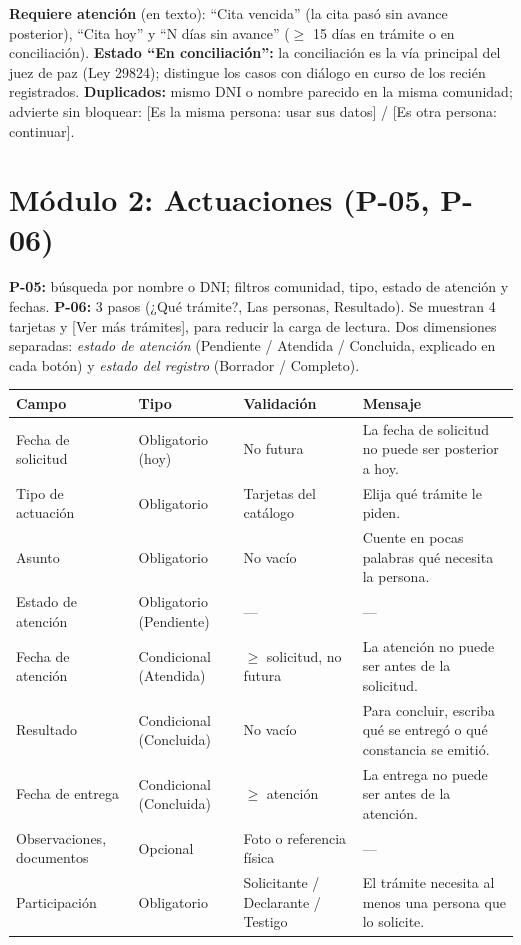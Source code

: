 \documentclass[11pt,a4paper]{article}
\begin{document}
\textbf{Requiere atención} (en texto): ``Cita vencida'' (la cita pasó sin avance posterior), ``Cita hoy'' y ``N días sin avance'' ($\geq$ 15 días en trámite o en conciliación). \textbf{Estado ``En conciliación'':} la conciliación es la vía principal del juez de paz (Ley 29824); distingue los casos con diálogo en curso de los recién registrados. \textbf{Duplicados:} mismo DNI o nombre parecido en la misma comunidad; advierte sin bloquear: [Es la misma persona: usar sus datos] / [Es otra persona: continuar].

\section{Módulo 2: Actuaciones (P-05, P-06)}
\textbf{P-05:} búsqueda por nombre o DNI; filtros comunidad, tipo, estado de atención y fechas. \textbf{P-06:} 3 pasos (¿Qué trámite?, Las personas, Resultado). Se muestran 4 tarjetas y [Ver más trámites], para reducir la carga de lectura. Dos dimensiones separadas: \emph{estado de atención} (Pendiente / Atendida / Concluida, explicado en cada botón) y \emph{estado del registro} (Borrador / Completo).

\begin{small}
\begin{longtable}{|L{3cm}|L{2.6cm}|L{4.4cm}|L{5.2cm}|}\hline
\textbf{Campo} & \textbf{Tipo} & \textbf{Validación} & \textbf{Mensaje}\\\hline\endhead
Fecha de solicitud & Obligatorio (hoy) & No futura & La fecha de solicitud no puede ser posterior a hoy.\\\hline
Tipo de actuación & Obligatorio & Tarjetas del catálogo & Elija qué trámite le piden.\\\hline
Asunto & Obligatorio & No vacío & Cuente en pocas palabras qué necesita la persona.\\\hline
Estado de atención & Obligatorio (Pendiente) & — & —\\\hline
Fecha de atención & Condicional (Atendida) & $\geq$ solicitud, no futura & La atención no puede ser antes de la solicitud.\\\hline
Resultado & Condicional (Concluida) & No vacío & Para concluir, escriba qué se entregó o qué constancia se emitió.\\\hline
Fecha de entrega & Condicional (Concluida) & $\geq$ atención & La entrega no puede ser antes de la atención.\\\hline
Observaciones, documentos & Opcional & Foto o referencia física & —\\\hline
Participación & Obligatorio & Solicitante / Declarante / Testigo & El trámite necesita al menos una persona que lo solicite.\\\hline
\end{longtable}
\end{small}
\end{document}
